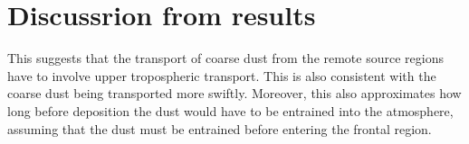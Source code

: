 \section{Discussrion from results}

This suggests that the transport of coarse dust from the remote source regions have to involve upper tropospheric transport. 
This is also consistent with the coarse dust being transported more swiftly.  
Moreover, this also approximates how long before deposition the dust would have to be entrained into the atmosphere, assuming that the dust must be entrained before entering the frontal region.  

